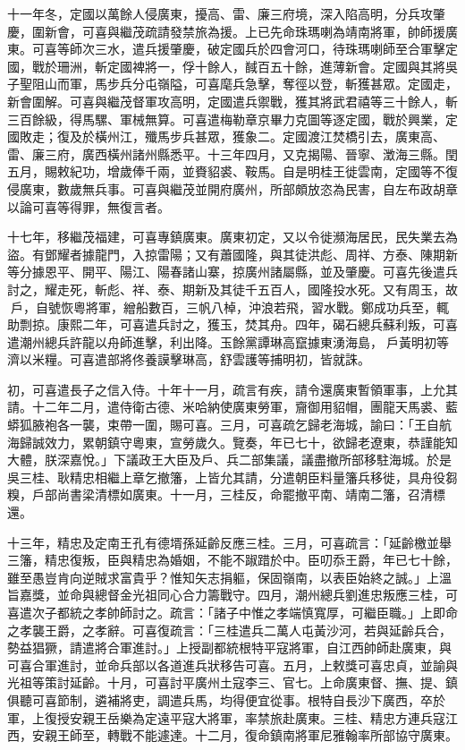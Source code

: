 \begin{pinyinscope}
十一年冬，定國以萬餘人侵廣東，擾高、雷、廉三府境，深入陷高明，分兵攻肇慶，圍新會，可喜與繼茂疏請發禁旅為援。上已先命珠瑪喇為靖南將軍，帥師援廣東。可喜等師次三水，遣兵援肇慶，破定國兵於四會河口，待珠瑪喇師至合軍擊定國，戰於珊洲，斬定國裨將一，俘十餘人，馘百五十餘，進薄新會。定國與其將吳子聖阻山而軍，馬步兵分屯嶺隘，可喜麾兵急擊，奪徑以登，斬獲甚眾。定國走，新會圍解。可喜與繼茂督軍攻高明，定國遣兵禦戰，獲其將武君禧等三十餘人，斬三百餘級，得馬騾、軍械無算。可喜遣梅勒章京畢力克圖等逐定國，戰於興業，定國敗走；復及於橫州江，殲馬步兵甚眾，獲象二。定國渡江焚橋引去，廣東高、雷、廉三府，廣西橫州諸州縣悉平。十三年四月，又克揭陽、晉寧、澂海三縣。閏五月，賜敕紀功，增歲俸千兩，並賚貂裘、鞍馬。自是明桂王徙雲南，定國等不復侵廣東，數歲無兵事。可喜與繼茂並開府廣州，所部頗放恣為民害，自左布政胡章以論可喜等得罪，無復言者。

十七年，移繼茂福建，可喜專鎮廣東。廣東初定，又以令徙瀕海居民，民失業去為盜。有鄧耀者據龍門，入掠雷陽；又有蕭國隆，與其徒洪彪、周祥、方泰、陳期新等分據恩平、開平、陽江、陽春諸山寨，掠廣州諸屬縣，並及肇慶。可喜先後遣兵討之，耀走死，斬彪、祥、泰、期新及其徒千五百人，國隆投水死。又有周玉，故戶，自號恢粵將軍，繒船數百，三帆八棹，沖浪若飛，習水戰。鄭成功兵至，輒助剽掠。康熙二年，可喜遣兵討之，獲玉，焚其舟。四年，碣石總兵蘇利叛，可喜遣潮州總兵許龍以舟師進擊，利出降。玉餘黨譚琳高竄據東湧海島，戶黃明初等濟以米糧。可喜遣部將佟養謨擊琳高，舒雲護等捕明初，皆就誅。

初，可喜遣長子之信入侍。十年十一月，疏言有疾，請令還廣東暫領軍事，上允其請。十二年二月，遣侍衛古德、米哈納使廣東勞軍，齎御用貂帽，團龍天馬裘、藍蟒狐腋袍各一襲，束帶一圍，賜可喜。三月，可喜疏乞歸老海城，諭曰：「王自航海歸誠效力，累朝鎮守粵東，宣勞歲久。覽奏，年已七十，欲歸老遼東，恭謹能知大體，朕深嘉悅。」下議政王大臣及戶、兵二部集議，議盡撤所部移駐海城。於是吳三桂、耿精忠相繼上章乞撤籓，上皆允其請，分遣朝臣料量籓兵移徙，具舟役芻糗，戶部尚書梁清標如廣東。十一月，三桂反，命罷撤平南、靖南二籓，召清標還。

十三年，精忠及定南王孔有德壻孫延齡反應三桂。三月，可喜疏言：「延齡檄並舉三籓，精忠復叛，臣與精忠為婚姻，不能不踧踖於中。臣叨忝王爵，年已七十餘，雖至愚豈肯向逆賊求富貴乎？惟知矢志捐軀，保固嶺南，以表臣始終之誠。」上溫旨嘉獎，並命與總督金光祖同心合力籌戰守。四月，潮州總兵劉進忠叛應三桂，可喜遣次子都統之孝帥師討之。疏言：「諸子中惟之孝端慎寬厚，可繼臣職。」上即命之孝襲王爵，之孝辭。可喜復疏言：「三桂遣兵二萬人屯黃沙河，若與延齡兵合，勢益猖獗，請遣將合軍進討。」上授副都統根特平寇將軍，自江西帥師赴廣東，與可喜合軍進討，並命兵部以各道進兵狀移告可喜。五月，上敕獎可喜忠貞，並諭與光祖等策討延齡。十月，可喜討平廣州土寇李三、官七。上命廣東督、撫、提、鎮俱聽可喜節制，遴補將吏，調遣兵馬，均得便宜從事。根特自長沙下廣西，卒於軍，上復授安親王岳樂為定遠平寇大將軍，率禁旅赴廣東。三桂、精忠方連兵寇江西，安親王師至，轉戰不能遽達。十二月，復命鎮南將軍尼雅翰率所部協守廣東。


\end{pinyinscope}
